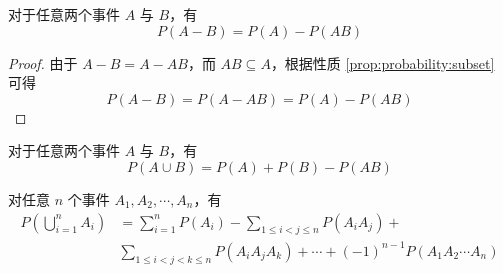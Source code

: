 \begin{property}
    \indent 对于任意两个事件 $A$ 与 $B$，有
    \begin{equation}
        P(A-B)=P(A)-P(AB)
    \end{equation}
\end{property}

\begin{proof}
    由于 $A-B=A-AB$，而 $AB \subseteq A$，根据性质 \ref{prop:probability:subset} 可得
    \[
    P(A-B)=P(A-AB)=P(A)-P(AB)
    \]
\end{proof}

\begin{property}
    \indent 对于任意两个事件 $A$ 与 $B$，有
    \begin{equation} \label{equation:add}
        P(A \cup B) = P(A) + P(B) - P(AB)
    \end{equation}

    对任意 $n$ 个事件 $A_1,A_2,\cdots,A_n$，有
    \begin{equation} \label{equation:normal add}
        \begin{aligned}
            P \left( \bigcup_{i=1}^n A_i \right) &= \sum_{i=1}^n P(A_i) - \sum_{1 \leqslant i<j \leqslant n} P(A_i A_j) + \\
            & \sum_{1 \leqslant i<j<k \leqslant n} P(A_i A_j A_k) + \cdots + (-1)^{n-1} P(A_1 A_2 \cdots A_n)
        \end{aligned}
    \end{equation}
\end{property}

